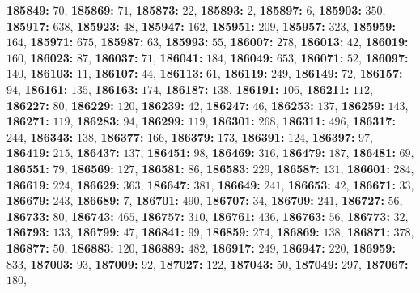 \textsf{\bfseries 185849:} $70$, \textsf{\bfseries 185869:} $71$, \textsf{\bfseries 185873:} $22$, \textsf{\bfseries 185893:} $2$, \textsf{\bfseries 185897:} $6$, \textsf{\bfseries 185903:} $350$, \textsf{\bfseries 185917:} $638$, \textsf{\bfseries 185923:} $48$, \textsf{\bfseries 185947:} $162$, \textsf{\bfseries 185951:} $209$, \textsf{\bfseries 185957:} $323$, \textsf{\bfseries 185959:} $164$, \textsf{\bfseries 185971:} $675$, \textsf{\bfseries 185987:} $63$, \textsf{\bfseries 185993:} $55$, \textsf{\bfseries 186007:} $278$, \textsf{\bfseries 186013:} $42$, \textsf{\bfseries 186019:} $160$, \textsf{\bfseries 186023:} $87$, \textsf{\bfseries 186037:} $71$, \textsf{\bfseries 186041:} $184$, \textsf{\bfseries 186049:} $653$, \textsf{\bfseries 186071:} $52$, \textsf{\bfseries 186097:} $140$, \textsf{\bfseries 186103:} $11$, \textsf{\bfseries 186107:} $44$, \textsf{\bfseries 186113:} $61$, \textsf{\bfseries 186119:} $249$, \textsf{\bfseries 186149:} $72$, \textsf{\bfseries 186157:} $94$, \textsf{\bfseries 186161:} $135$, \textsf{\bfseries 186163:} $174$, \textsf{\bfseries 186187:} $138$, \textsf{\bfseries 186191:} $106$, \textsf{\bfseries 186211:} $112$, \textsf{\bfseries 186227:} $80$, \textsf{\bfseries 186229:} $120$, \textsf{\bfseries 186239:} $42$, \textsf{\bfseries 186247:} $46$, \textsf{\bfseries 186253:} $137$, \textsf{\bfseries 186259:} $143$, \textsf{\bfseries 186271:} $119$, \textsf{\bfseries 186283:} $94$, \textsf{\bfseries 186299:} $119$, \textsf{\bfseries 186301:} $268$, \textsf{\bfseries 186311:} $496$, \textsf{\bfseries 186317:} $244$, \textsf{\bfseries 186343:} $138$, \textsf{\bfseries 186377:} $166$, \textsf{\bfseries 186379:} $173$, \textsf{\bfseries 186391:} $124$, \textsf{\bfseries 186397:} $97$, \textsf{\bfseries 186419:} $215$, \textsf{\bfseries 186437:} $137$, \textsf{\bfseries 186451:} $98$, \textsf{\bfseries 186469:} $316$, \textsf{\bfseries 186479:} $187$, \textsf{\bfseries 186481:} $69$, \textsf{\bfseries 186551:} $79$, \textsf{\bfseries 186569:} $127$, \textsf{\bfseries 186581:} $86$, \textsf{\bfseries 186583:} $229$, \textsf{\bfseries 186587:} $131$, \textsf{\bfseries 186601:} $284$, \textsf{\bfseries 186619:} $224$, \textsf{\bfseries 186629:} $363$, \textsf{\bfseries 186647:} $381$, \textsf{\bfseries 186649:} $241$, \textsf{\bfseries 186653:} $42$, \textsf{\bfseries 186671:} $33$, \textsf{\bfseries 186679:} $243$, \textsf{\bfseries 186689:} $7$, \textsf{\bfseries 186701:} $490$, \textsf{\bfseries 186707:} $34$, \textsf{\bfseries 186709:} $241$, \textsf{\bfseries 186727:} $56$, \textsf{\bfseries 186733:} $80$, \textsf{\bfseries 186743:} $465$, \textsf{\bfseries 186757:} $310$, \textsf{\bfseries 186761:} $436$, \textsf{\bfseries 186763:} $56$, \textsf{\bfseries 186773:} $32$, \textsf{\bfseries 186793:} $133$, \textsf{\bfseries 186799:} $47$, \textsf{\bfseries 186841:} $99$, \textsf{\bfseries 186859:} $274$, \textsf{\bfseries 186869:} $138$, \textsf{\bfseries 186871:} $378$, \textsf{\bfseries 186877:} $50$, \textsf{\bfseries 186883:} $120$, \textsf{\bfseries 186889:} $482$, \textsf{\bfseries 186917:} $249$, \textsf{\bfseries 186947:} $220$, \textsf{\bfseries 186959:} $833$, \textsf{\bfseries 187003:} $93$, \textsf{\bfseries 187009:} $92$, \textsf{\bfseries 187027:} $122$, \textsf{\bfseries 187043:} $50$, \textsf{\bfseries 187049:} $297$, \textsf{\bfseries 187067:} $180$, 

